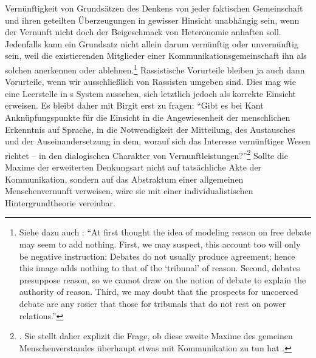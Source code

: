 Vernünftigkeit von Grundsätzen des Denkens von jeder faktischen Gemeinschaft und
ihren geteilten Überzeugungen in gewisser Hinsicht unabhängig sein, wenn der
Vernunft nicht doch der Beigeschmack von Heteronomie anhaften soll. Jedenfalls
kann ein Grundsatz nicht allein darum vernünftig oder unvernünftig sein, weil
die existierenden Mitglieder einer Kommunikationsgemeinschaft ihn als solchen
anerkennen oder ablehnen.\footnote{Siehe dazu auch
\cite[][20]{ONeill:ConstructionsofReason1989}: \enquote{At first thought the
idea of modeling reason on free debate may seem to add nothing. First, we may
suspect, this account too will only be negative instruction: Debates do not
usually produce agreement; hence this image adds nothing to that of the
\enquote{tribunal} of reason. Second, debates presuppose reason, so we cannot
draw on the notion of debate to explain the authority of reason. Third, we may doubt
that the prospects for uncoerced debate are any rosier that those for tribunals
that do not rest on power relations.}} Rassistische Vorurteile bleiben ja auch
dann Vorurteile, wenn wir ausschließlich von Rassisten umgeben sind. Dies mag
wie eine Leerstelle in s System aussehen, sich letztlich
jedoch als korrekte Einsicht erweisen. Es bleibt daher mit Birgit
 erst zu fragen: \enquote{Gibt es bei Kant Anknüpfungspunkte
für die Einsicht in die Angewiesenheit der menschlichen Erkenntnis auf Sprache,
in die Notwendigkeit der Mitteilung, des Austausches und der Auseinandersetzung in dem, worauf sich das
Interesse vernünftiger Wesen richtet -- in den dialogischen Charakter von
Vernunftleistungen?}\footnote{\cite[114]{Recki:enquoteAnderStelle[je]desanderendenken2006}.
Sie stellt daher explizit die Frage, ob diese zweite Maxime des gemeinen
Menschenverstandes überhaupt etwas mit Kommunikation zu tun hat
\parencite[vgl.][116]{Recki:enquoteAnderStelle[je]desanderendenken2006}.} Sollte
die Maxime der erweiterten Denkungsart nicht auf tatsächliche Akte der
Kommunikation, sondern auf das Abstraktum einer allgemeinen Menschenvernunft
verweisen, wäre sie mit einer individualistischen Hintergrundtheorie vereinbar.


